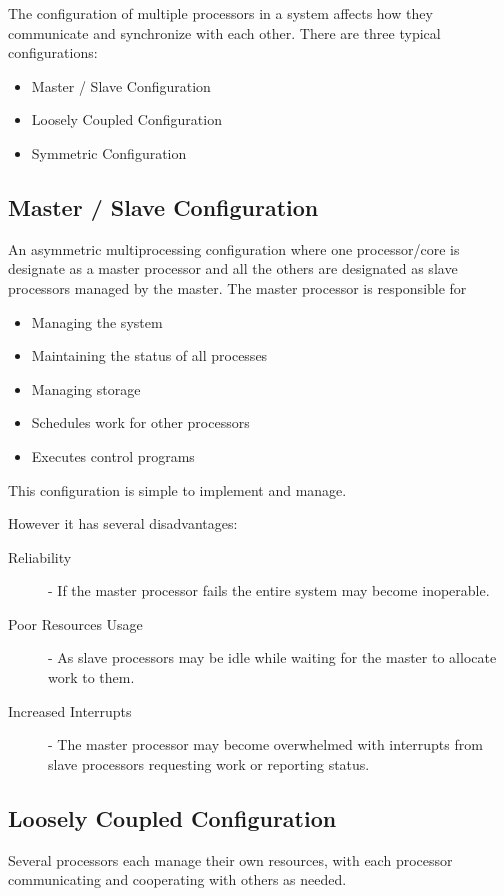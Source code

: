 \documentclass[12pt letter]{report}
\begin{document}
The configuration of multiple processors in a system affects how they
communicate and synchronize with each other. There are three typical
configurations:
\begin{itemize}
  \item Master / Slave Configuration
  \item Loosely Coupled Configuration
  \item Symmetric Configuration
\end{itemize}

\subsection{Master / Slave Configuration}
An asymmetric multiprocessing configuration where one processor/core
is designate as a master processor and all the others are designated
as slave processors managed by the master.
The master processor is responsible for
\begin{itemize}
  \item Managing the system
  \item Maintaining the status of all processes
  \item Managing storage
  \item Schedules work for other processors
  \item Executes control programs
\end{itemize}

This configuration is simple to implement and manage.

However it has several disadvantages:
\begin{description}
  \item[Reliability] - If the master processor fails the entire system
    may become inoperable.
  \item[Poor Resources Usage] - As slave processors may be idle
    while waiting for the master to allocate work to them.
  \item[Increased Interrupts] - The master processor may become
    overwhelmed with interrupts from slave processors requesting
    work or reporting status.
\end{description}

\subsection{Loosely Coupled Configuration}
Several processors each manage their own resources, with each
processor communicating and cooperating with others as needed.
\end{document}
